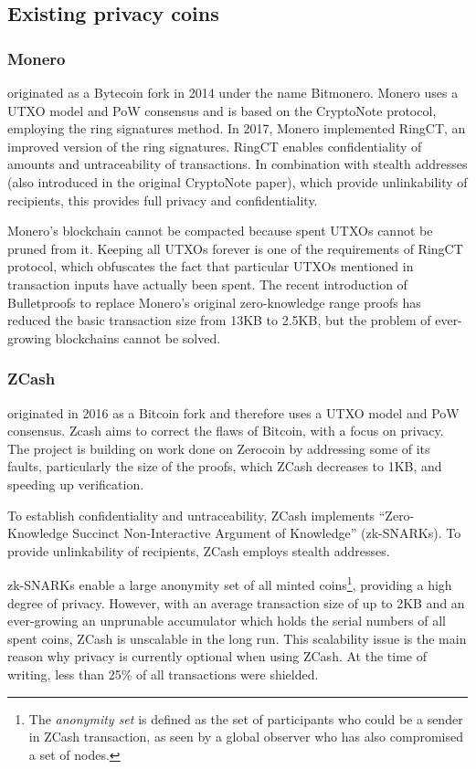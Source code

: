 \documentclass[a4paper, 10pt, conference]{ieeeconf}
\begin{document}
\subsection{Existing privacy coins}

\subsubsection{Monero} originated as a Bytecoin fork in 2014 under the name Bitmonero. Monero uses a UTXO model and PoW consensus and is based on the CryptoNote protocol\cite{c2}, employing the ring signatures method. In 2017, Monero implemented RingCT\cite{c3}, an improved version of the ring signatures. RingCT enables confidentiality of amounts and untraceability of transactions. In combination with stealth addresses (also introduced in the original CryptoNote paper), which provide unlinkability of recipients, this provides full privacy and confidentiality.

Monero's blockchain cannot be compacted because spent UTXOs cannot be pruned from it. Keeping all UTXOs forever is one of the requirements of RingCT protocol, which obfuscates the fact that particular UTXOs mentioned in transaction inputs have actually been spent. 
The recent introduction of Bulletproofs\cite{c4} to replace Monero's original zero-knowledge range proofs has reduced the basic transaction size from 13KB to 2.5KB, but the problem of ever-growing blockchains cannot be solved. 

\subsubsection{ZCash} originated in 2016 as a Bitcoin fork and therefore uses a UTXO model and PoW consensus. Zcash aims to correct the flaws of Bitcoin, with a focus on privacy. The project is building on work done on Zerocoin\cite{c5} by addressing some of its faults, particularly the size of the proofs, which ZCash decreases to 1KB, and speeding up verification.

To establish confidentiality and untraceability, ZCash implements ``Zero-Knowledge Succinct Non-Interactive Argument of Knowledge'' (zk-SNARKs)\cite{c6}. To provide unlinkability of recipients, ZCash employs stealth addresses.

zk-SNARKs enable a large anonymity set of all minted coins\footnote{The \textit{anonymity set} is defined as the set of participants who could be a sender in ZCash transaction, as seen by a global observer who has also compromised a set of nodes.}, providing a high degree of privacy. However, with an average transaction size of up to 2KB and an ever-growing an unprunable accumulator which holds the serial numbers of all spent coins, ZCash is unscalable in the long run. This scalability issue is the main reason why privacy is currently optional when using ZCash. At the time of writing, less than 25\% of all transactions were shielded.
\end{document}
